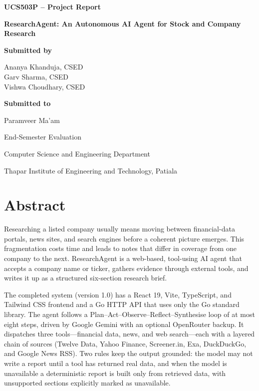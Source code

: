 \documentclass[12pt,a4paper,oneside]{report}
\begin{document}
\begin{titlepage}\centering
\vspace*{0.7cm}
{\Large\bfseries UCS503P -- Project Report\par}
\vspace{1.5cm}
{\Huge\bfseries ResearchAgent: An Autonomous AI Agent for Stock and Company Research\par}
\vspace{0.5cm}{\Large Final Project Report\par}
\vspace{1.5cm}
{\large\bfseries Submitted by\par}\vspace{0.4cm}
Ananya Khanduja, CSED \\
Garv Sharma, CSED \\
Vishwa Choudhary, CSED \\
\vspace{1.2cm}
{\large\bfseries Submitted to\par}\vspace{0.3cm}
{\Large Paramveer Ma'am\par}
\vfill
{\large End-Semester Evaluation\par}
{\large Computer Science and Engineering Department\par}
{\large Thapar Institute of Engineering and Technology, Patiala\par}
\vspace{0.5cm}{\large November 2026\par}
\end{titlepage}

\chapter*{Abstract}
Researching a listed company usually means moving between financial-data portals, news sites, and search engines before a coherent picture emerges. This fragmentation costs time and leads to notes that differ in coverage from one company to the next. ResearchAgent is a web-based, tool-using AI agent that accepts a company name or ticker, gathers evidence through external tools, and writes it up as a structured six-section research brief.

The completed system (version 1.0) has a React 19, Vite, TypeScript, and Tailwind CSS frontend and a Go HTTP API that uses only the Go standard library. The agent follows a Plan--Act--Observe--Reflect--Synthesise loop of at most eight steps, driven by Google Gemini with an optional OpenRouter backup. It dispatches three tools---financial data, news, and web search---each with a layered chain of sources (Twelve Data, Yahoo Finance, Screener.in, Exa, DuckDuckGo, and Google News RSS). Two rules keep the output grounded: the model may not write a report until a tool has returned real data, and when the model is unavailable a deterministic report is built only from retrieved data, with unsupported sections explicitly marked as unavailable.
\end{document}
